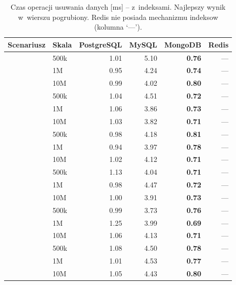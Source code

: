 \begin{table}[H]
\centering
\caption{Czas operacji usuwania danych [ms] -- z~indeksami. Najlepszy wynik w~wierszu pogrubiony. Redis nie posiada mechanizmu indeksow (kolumna `---').}
\label{tab:delete_idx}
\small
\begin{tabular}{@{}llrrrr@{}}
\toprule
\textbf{Scenariusz} & \textbf{Skala} & \textbf{PostgreSQL} & \textbf{MySQL} & \textbf{MongoDB} & \textbf{Redis} \\
\midrule
{}
 & 500k & 1.01 & 5.10 & \textbf{0.76} & --- \\
 & 1M & 0.95 & 4.24 & \textbf{0.74} & --- \\
 & 10M & 0.99 & 4.02 & \textbf{0.80} & --- \\
\midrule
{}
 & 500k & 1.04 & 4.51 & \textbf{0.72} & --- \\
 & 1M & 1.06 & 3.86 & \textbf{0.73} & --- \\
 & 10M & 1.03 & 3.82 & \textbf{0.71} & --- \\
\midrule
{}
 & 500k & 0.98 & 4.18 & \textbf{0.81} & --- \\
 & 1M & 0.94 & 3.97 & \textbf{0.78} & --- \\
 & 10M & 1.02 & 4.12 & \textbf{0.71} & --- \\
\midrule
{}
 & 500k & 1.13 & 4.04 & \textbf{0.71} & --- \\
 & 1M & 0.98 & 4.47 & \textbf{0.72} & --- \\
 & 10M & 1.00 & 3.91 & \textbf{0.73} & --- \\
\midrule
{}
 & 500k & 0.99 & 3.73 & \textbf{0.76} & --- \\
 & 1M & 1.25 & 3.99 & \textbf{0.69} & --- \\
 & 10M & 1.06 & 4.13 & \textbf{0.71} & --- \\
\midrule
{}
 & 500k & 1.08 & 4.50 & \textbf{0.78} & --- \\
 & 1M & 1.01 & 4.53 & \textbf{0.77} & --- \\
 & 10M & 1.05 & 4.43 & \textbf{0.80} & --- \\
\bottomrule
\end{tabular}
\end{table}
